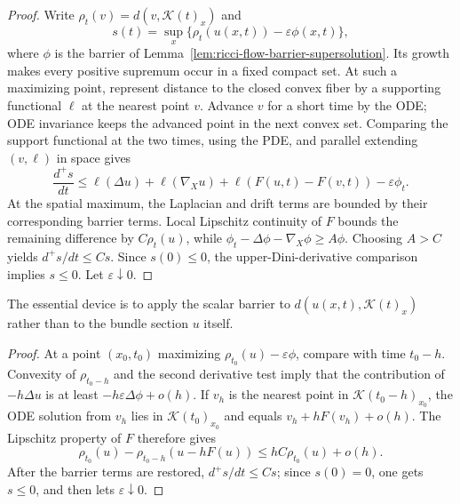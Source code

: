\begin{proof}
\sketch
{}
Write $\rho_t(v)=d(v,\mathcal K(t)_x)$ and
\[
s(t)=\sup_x\{\rho_t(u(x,t))-\varepsilon\phi(x,t)\},
\]
where $\phi$ is the barrier of
Lemma~\ref{lem:ricci-flow-barrier-supersolution}.  Its growth makes every
positive supremum occur in a fixed compact set.  At such a maximizing point,
represent distance to the closed convex fiber by a supporting functional
$\ell$ at the nearest point $v$.  Advance $v$ for a short time by the ODE;
ODE invariance keeps the advanced point in the next convex set.  Comparing
the support functional at the two times, using the PDE, and parallel
extending $(v,\ell)$ in space gives
\[
\frac{d^+s}{dt}\leq
\ell(\Delta u)+\ell(\nabla_Xu)+
\ell(F(u,t)-F(v,t))-\varepsilon\phi_t.
\]
At the spatial maximum, the Laplacian and drift terms are bounded by their
corresponding barrier terms.  Local Lipschitz continuity of $F$ bounds the
remaining difference by $C\rho_t(u)$, while
$\phi_t-\Delta\phi-\nabla_X\phi\geq A\phi$.  Choosing $A>C$ yields
$d^+s/dt\leq Cs$.  Since $s(0)\leq0$, the upper-Dini-derivative comparison
implies $s\leq0$.  Let $\varepsilon\downarrow0$.
\end{proof}

\begin{remark}
\label{rem:barrier-applied-to-distance-from-convex-set}
The essential device is to apply the scalar barrier to
$d(u(x,t),\mathcal K(t)_x)$ rather than to the bundle section $u$ itself.
\end{remark}

\begin{proof}
\sketch
{}
At a point $(x_0,t_0)$ maximizing
$\rho_{t_0}(u)-\varepsilon\phi$, compare with time $t_0-h$.  Convexity of
$\rho_{t_0-h}$ and the second derivative test imply that the contribution of
$-h\Delta u$ is at least $-h\varepsilon\Delta\phi+o(h)$.  If $v_h$ is the
nearest point in $\mathcal K(t_0-h)_{x_0}$, the ODE solution from $v_h$ lies
in $\mathcal K(t_0)_{x_0}$ and equals $v_h+hF(v_h)+o(h)$.  The Lipschitz
property of $F$ therefore gives
\[
\rho_{t_0}(u)-\rho_{t_0-h}(u-hF(u))
\leq hC\rho_{t_0}(u)+o(h).
\]
After the barrier terms are restored, $d^+s/dt\leq Cs$; since $s(0)=0$, one
gets $s\leq0$, and then lets $\varepsilon\downarrow0$.
\end{proof}

